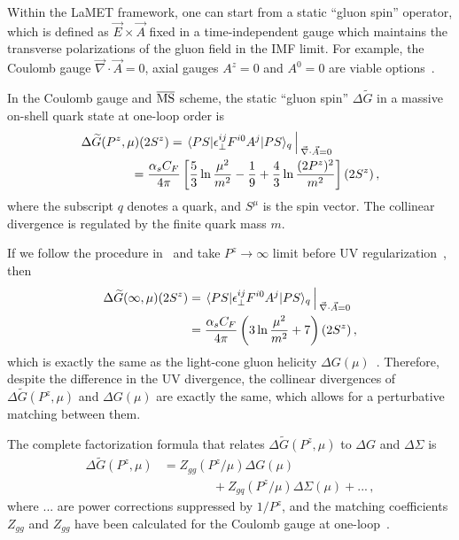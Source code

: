 \documentclass[aps,rmp,reprint,amsmath,amssymb,graphicx,longbibliography]{revtex4-1} %
\newcommand{\MS}{{\overline{\rm MS}}}
\newcommand{\nn}{\nonumber}
\begin{document}
Within the LaMET framework, one can start from  a static ``gluon spin'' operator, which is defined as $\vec{E}\times \vec{A}$ fixed in a time-independent gauge which maintains
the transverse polarizations of the gluon field in the IMF limit. For example, the Coulomb gauge $\vec{\nabla}\cdot \vec{A}=0$, axial gauges $A^z=0$ and $A^0=0$ are viable options~\cite{Hatta:2013gta}.

In the Coulomb gauge and $\MS$ scheme, the static ``gluon spin'' $\Delta \widetilde G$ in a massive on-shell quark state at one-loop order is~\cite{Chen:2011gn,Ji:2013fga}
\begin{align}  \label{eq:coulomb}
	&\Delta \widetilde G(P^z, \mu)  (2S^z)=\left.\langle PS| \epsilon^{ij}_\perp F^{i0}A^j|PS\rangle_q \right\arrowvert_{\vec{\nabla}\cdot \vec{A}=0}\\
	&\qquad\qquad = \frac{\alpha_sC_F}{4\pi} \left[ {5\over 3}\ln{\mu^2\over m^2} -\frac{1}{9} + \frac{4}{3}\ln \frac{(2P^z)^2}{m^2}\right](2S^z) \,,\nn
\end{align}
where the subscript $q$ denotes a quark, and $S^\mu$ is the spin vector. The collinear divergence is regulated by the finite quark mass $m$.

If we follow the procedure in~\cite{Weinberg:1966jm} and take $P^z\to\infty$ limit before UV regularization~\cite{Ji:2013fga}, then
\begin{align} \label{eq:coulombimf}
	\Delta \widetilde{G}(\infty, \mu) (2S^z)&= \left. \langle PS| \epsilon^{ij}_\perp F^{i0}A^j|PS\rangle_q\right\arrowvert_{\vec{\nabla}\cdot \vec{A}=0}\nn\\
	&=\frac{\alpha_sC_F}{4\pi}\left(3\ln{\mu^2\over m^2}+7\right) (2S^z)\,,
\end{align}
which is exactly the same as the light-cone gluon helicity $\Delta G(\mu)$~\cite{Hoodbhoy:1998bt}. Therefore,
despite the difference in the UV divergence, the collinear divergences of $\Delta \widetilde G(P^z,\mu)$ and $\Delta G(\mu)$ are exactly the same,
which allows for a perturbative matching between them.

The complete factorization formula that relates $\Delta\widetilde G(P^z,\mu)$ to $\Delta G$ and $\Delta \Sigma$ is
\begin{align} \label{eq:deltaGmatching}
	\Delta\widetilde G(P^z,\mu) &= Z_{gg}(P^z/\mu)\Delta G(\mu) \nn\\
	&\qquad\qquad+ Z_{gq}(P^z/\mu)\Delta\Sigma(\mu) +...\,,
\end{align}
where $...$ are power corrections suppressed by $1/P^z$, and the matching coefficients $Z_{gg}$ and $Z_{gg}$ have been calculated for the Coulomb gauge at one-loop~\cite{Ji:2014lra}.
\end{document}
